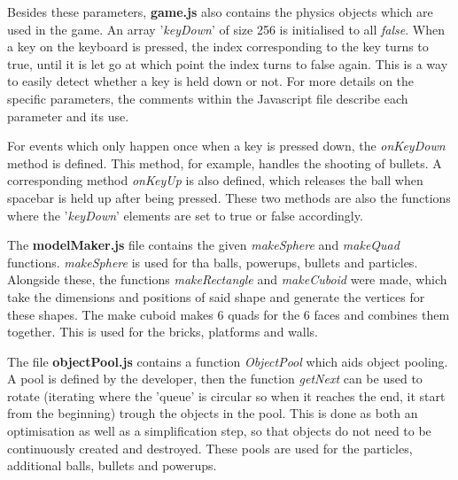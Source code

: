 Besides these parameters, \textbf{game.js} also contains the physics objects which are used in the game. An array '\textit{keyDown}' of size 256 is initialised to all \textit{false}. When a key on the keyboard is pressed, the index corresponding to the key turns to true, until it is let go at which point the index turns to false again. This is a way to easily detect whether a key is held down or not. For more details on the specific parameters, the comments within the Javascript file describe each parameter and its use.

For events which only happen once when a key is pressed down, the \textit{onKeyDown} method is defined. This method, for example, handles the shooting of bullets. A corresponding method \textit{onKeyUp} is also defined, which releases the ball when spacebar is held up after being pressed. These two methods are also the functions where the '\textit{keyDown}' elements are set to true or false accordingly.

The \textbf{modelMaker.js} file contains the given \textit{makeSphere} and \textit{makeQuad} functions. \textit{makeSphere} is used for tha balls, powerups, bullets and particles. Alongside these, the functions \textit{makeRectangle} and \textit{makeCuboid} were made, which take the dimensions and positions of said shape and generate the vertices for these shapes. The make cuboid makes 6 quads for the 6 faces and combines them together. This is used for the bricks, platforms and walls.

The file \textbf{objectPool.js} contains a function \textit{ObjectPool} which aids object pooling. A pool is defined by the developer, then the function \textit{getNext} can be used to rotate (iterating where the 'queue' is circular so when it reaches the end, it start from the beginning) trough the objects in the pool. This is done as both an optimisation as well as a simplification step, so that objects do not need to be continuously created and destroyed. These pools are used for the particles, additional balls, bullets and powerups.

